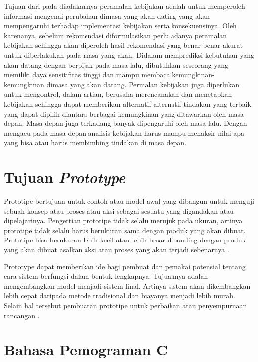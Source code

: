 \par Tujuan dari pada diadakannya peramalan kebijakan adalah untuk memperoleh informasi mengenai perubahan dimasa yang akan dating yang akan mempengaruhi terhadap implementasi kebijakan serta konsekuensinya. Oleh karenanya, sebelum rekomendasi diformulasikan perlu adanya peramalan kebijakan sehingga akan diperoleh hasil rekomendasi yang benar-benar akurat untuk diberlakukan pada masa yang akan. Didalam memprediksi kebutuhan yang akan datang dengan berpijak pada masa lalu, dibutuhkan seseorang yang memiliki daya sensitifitas tinggi dan mampu membaca kemungkinan-kemungkinan dimasa yang akan datang. Permalan kebijakan juga diperlukan untuk mengontrol, dalam artian, berusaha merencanakan dan menetapkan kebijakan sehingga dapat memberikan alternatif-alternatif tindakan yang terbaik yang dapat dipilih diantara berbagai kemungkinan yang ditawarkan oleh masa depan. Masa depan juga terkadang banyak dipengaruhi oleh masa lalu. Dengan mengacu pada masa depan analisis kebijakan harus mampu menaksir nilai apa yang bisa atau harus membimbing tindakan di masa depan.\\



\section{Tujuan \textit{Prototype}}
Prototipe bertujuan untuk contoh atau model awal yang dibangun untuk menguji sebuah konsep atau proses atau aksi sebagai sesuatu yang digandakan atau dipelajarinya. Pengertian prototipe tidak selalu merujuk pada ukuran, artinya prototipe tidak selalu harus berukuran sama dengan produk yang akan dibuat. Prototipe bisa berukuran lebih kecil atau lebih besar dibanding dengan produk yang akan dibuat asalkan aksi atau proses yang akan terjadi sebenarnya . 

Prototype dapat memberikan ide bagi pembuat dan pemakai potensial tentang cara sistem berfungsi dalam bentuk lengkapnya. Tujuannya adalah mengembangkan model menjadi sistem final. Artinya sistem akan dikembangkan lebih cepat daripada metode tradisional dan biayanya menjadi lebih murah. Selain hal tersebut pembuatan prototipe untuk perbaikan atau penyempurnaan rancangan .

\section{Bahasa Pemograman C}
